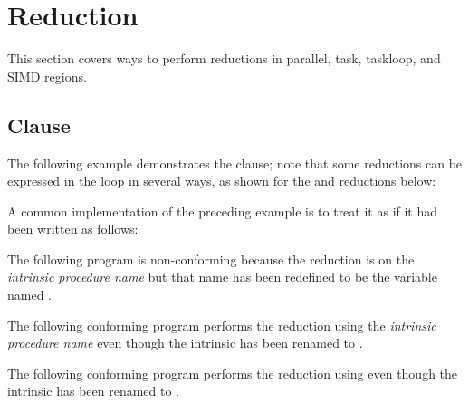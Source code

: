 \pagebreak

\section{Reduction}
\label{sec:reduction}

This section covers ways to perform reductions in parallel, task, taskloop, and SIMD regions.

\subsection{ Clause}
\label{subsec:reduction}

The following example demonstrates the  clause; note that some 
reductions can be expressed in the loop in several ways, as shown for the  
and  reductions below:


\pagebreak


A common implementation of the preceding example is to treat it as if it had been 
written as follows:


\fortranspecificstart
{}

The following program is non-conforming because the reduction is on the 
\emph{intrinsic procedure name}  but that name has been redefined to be the variable 
named .

\begin{figure}[t!]
\end{figure}

The following conforming program performs the reduction using the 
\emph{intrinsic procedure name}  even though the intrinsic  has been renamed 
to .


The following conforming program performs the reduction using 
  even though the intrinsic  has been renamed 
to .

